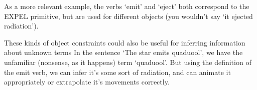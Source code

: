 \documentclass{article}
\begin{document}
    As a more relevant example, the verbs `emit' and `eject' both correspond to the EXPEL primitive, but are used for different objects (you wouldn't say `it ejected radiation').

    These kinds of object constraints could also be useful for inferring information about unknown terms In the sentence `The star emits quaduool', we have the unfamiliar (nonsense, as it happens) term `quaduool'. But using the definition of the emit verb, we can infer it's some sort of radiation, and can animate it appropriately or extrapolate it's movements correctly.

    
    
\end{document}

